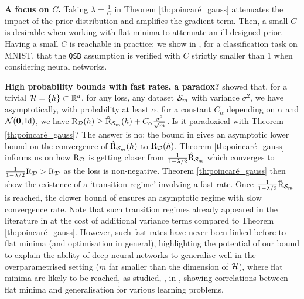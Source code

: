 \noindent\textbf{A focus on $C$.}
Taking $\lambda= \frac{1}{C}$ in Theorem \ref{th:poincaré_gauss} attenuates the impact of the prior distribution and amplifies the gradient term. Then, a small $C$ is desirable when working with flat minima to attenuate an ill-designed prior. Having a small $C$ is reachable in practice: we show in , for a classification task on MNIST, that the \texttt{QSB} assumption is verified with $C$ strictly smaller than $1$ when considering neural networks.
  
\noindent\textbf{High probability bounds with fast rates, a paradox?} \citet[page 7]{grunwald2021mac} showed that, for a trivial $\Hcal=\{h\}\subset \Rbb^d$, for any loss, any \iid dataset $\S_m$ with variance $\sigma^2$, we have asymptotically, with probability at least $\alpha$, for a constant $C_{\alpha}$ depending on $\alpha$ and $\Ncal(\zerobf,\textrm{Id})$, we have $\Risk_\D(h) \geq \hat{\Risk}_{\S_m}(h) + C_{\alpha}\frac{\sigma^2}{\sqrt{m}}$. Is it paradoxical with Theorem \ref{th:poincaré_gauss}? The answer is no: the bound in \citet{grunwald2021mac} gives an asymptotic lower bound on the convergence of $\hat{\Risk}_{\S_m}(h)$ to  $\Risk_\D(h)$. Theorem 
  \ref{th:poincaré_gauss} informs us on how $\Risk_\D$ is getting closer from $\frac{1}{1-\lambda/2}\hat{\Risk}_{\S_m}$ which converges to $\frac{1}{1-\lambda/2}\Risk_\D>\Risk_\D$ as the loss is non-negative.  
  Theorem \ref{th:poincaré_gauss} then show the existence of a `transition regime' involving a fast rate. Once  $\frac{1}{1-\lambda/2} \hat{\Risk}_{\S_m}$ is reached, the clower bound of \citet{grunwald2021mac} ensures an asymptotic regime with slow convergence rate. Note that such transition regimes already appeared in the literature in \citet{tolstikhin2013pac,mhammedi2019pac} at the cost of additional variance terms compared to Theorem \ref{th:poincaré_gauss}. However, such fast rates have never been linked before to flat minima (and optimisation in general), highlighting the potential of our bound to explain the ability of deep neural networks to generalise well in the overparametrised setting ($m$ far smaller than the dimension of $\Hcal$), where flat minima are likely to be reached, as studied, \eg, in \citet{dziugaite2020search}, showing correlations between flat minima and generalisation for various learning problems. 

